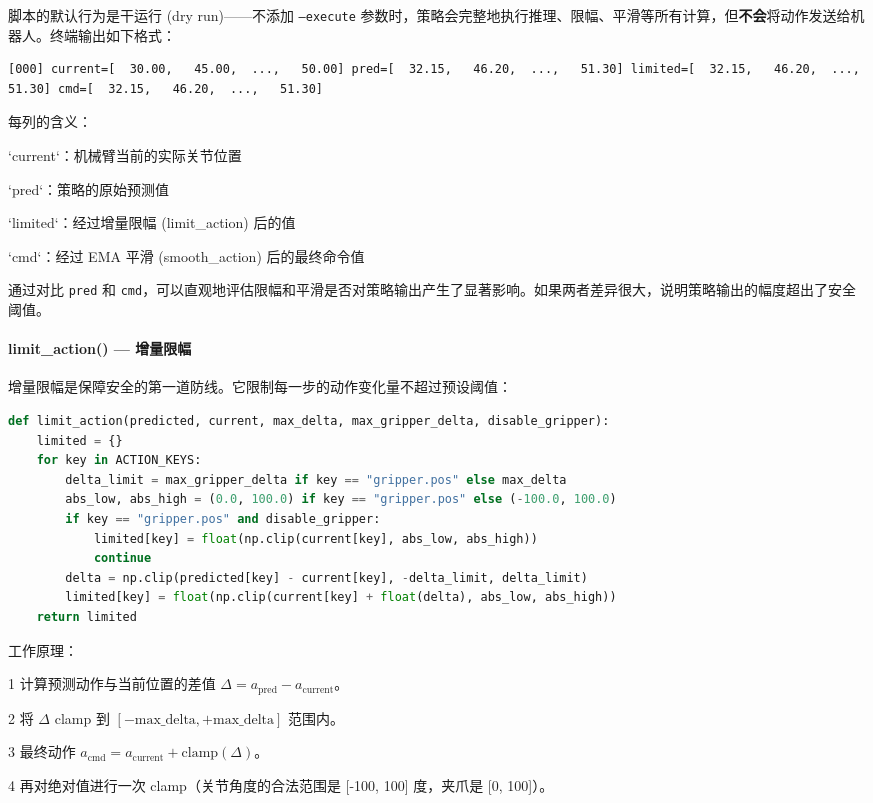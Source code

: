 \documentclass[UTF8,a4paper,11pt]{ctexart}
\begin{document}
{脚本的默认行为是干运行 (dry run)——不添加 \texttt{--execute} 参数时，策略会完整地执行推理、限幅、平滑等所有计算，但\textbf{不会}将动作发送给机器人。终端输出如下格式：

\begin{lstlisting}[language=text]
[000] current=[  30.00,   45.00,  ...,   50.00] pred=[  32.15,   46.20,  ...,   51.30] limited=[  32.15,   46.20,  ...,   51.30] cmd=[  32.15,   46.20,  ...,   51.30]
\end{lstlisting}

每列的含义：
\item `current`：机械臂当前的实际关节位置
\item `pred`：策略的原始预测值
\item `limited`：经过增量限幅 (limit_action) 后的值
\item `cmd`：经过 EMA 平滑 (smooth_action) 后的最终命令值

通过对比 \texttt{pred} 和 \texttt{cmd}，可以直观地评估限幅和平滑是否对策略输出产生了显著影响。如果两者差异很大，说明策略输出的幅度超出了安全阈值。

\paragraph{limit_action() — 增量限幅}


增量限幅是保障安全的第一道防线。它限制每一步的动作变化量不超过预设阈值：

\begin{lstlisting}[language=python]
def limit_action(predicted, current, max_delta, max_gripper_delta, disable_gripper):
    limited = {}
    for key in ACTION_KEYS:
        delta_limit = max_gripper_delta if key == "gripper.pos" else max_delta
        abs_low, abs_high = (0.0, 100.0) if key == "gripper.pos" else (-100.0, 100.0)
        if key == "gripper.pos" and disable_gripper:
            limited[key] = float(np.clip(current[key], abs_low, abs_high))
            continue
        delta = np.clip(predicted[key] - current[key], -delta_limit, delta_limit)
        limited[key] = float(np.clip(current[key] + float(delta), abs_low, abs_high))
    return limited
\end{lstlisting}

工作原理：
\item[1] 计算预测动作与当前位置的差值 $\Delta = a_{\text{pred}} - a_{\text{current}}$。
\item[2] 将 $\Delta$ clamp 到 $[-\text{max\_delta}, +\text{max\_delta}]$ 范围内。
\item[3] 最终动作 $a_{\text{cmd}} = a_{\text{current}} + \text{clamp}(\Delta)$。
\item[4] 再对绝对值进行一次 clamp（关节角度的合法范围是 [-100, 100] 度，夹爪是 [0, 100]）。

}
\end{document}
